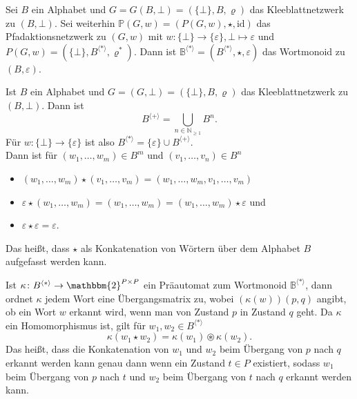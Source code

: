 \documentclass{article}
\begin{document}
\begin{definition}
  Sei $B$ ein Alphabet
  und $G = G(B, \bot) = (\{\bot\}, B, \varrho)$ das Kleeblattnetzwerk zu $(B, \bot)$.
  Sei weiterhin $\mathbb{P}(G, w) = (P(G, w), \star, \text{id})$ das Pfadaktionsnetzwerk
  zu $(G, w)$
  mit $w \colon \{\bot\} \to \{\varepsilon\}, \bot \mapsto \varepsilon$
  und $P(G, w) = (\{\bot\}, B^{\langle \ast \rangle}, \varrho^\ast)$.
  Dann ist $\mathbb{B}^{\langle \ast \rangle} = (B^{\langle \ast \rangle}, \star, \varepsilon)$
  das Wortmonoid zu $(B, \varepsilon)$.
\end{definition}

\begin{remark}
  Ist $B$ ein Alphabet und $G = (G, \bot) = (\{\bot\}, B, \varrho)$
  das Kleeblattnetzwerk zu $(B, \bot)$.
  Dann ist
  \begin{equation*}
    B^{\langle + \rangle} = \bigcup_{n \in \mathbb{N}_{\geq 1}} B^n.
  \end{equation*}
  Für $w \colon \{\bot\} \to \{\varepsilon\}$
  ist also $B^{\langle \ast \rangle} = \{\varepsilon\} \cup B^{\langle + \rangle}$. \\
  Dann ist für $(w_1, \dots, w_m) \in B^m$ und $(v_1, \dots, v_n) \in B^n$
  \begin{itemize}
    \item $(w_1, \dots, w_m) \star (v_1, \dots, v_m) = (w_1, \dots, w_m, v_1, \dots, v_m)$
    \item $\varepsilon \star (w_1, \dots, w_m) = (w_1, \dots, w_m) = (w_1, \dots, w_m) \star \varepsilon$ und
    \item $\varepsilon \star \varepsilon = \varepsilon.$
  \end{itemize}
  Das heißt, dass $\star$ als Konkatenation von Wörtern über dem Alphabet $B$ aufgefasst werden kann.
\end{remark}

\begin{remark}
  Ist $\kappa \colon B^{\langle \ast \rangle} \to \mathbbm{2}^{P \times P}$ ein Präautomat zum Wortmonoid $\mathbb{B}^{\langle \ast \rangle}$,
  dann ordnet $\kappa$ jedem Wort eine Übergangsmatrix zu,
  wobei $(\kappa(w))(p, q)$ angibt, ob ein Wort $w$
  erkannt wird, wenn man von Zustand $p$ in Zustand $q$ geht.
  Da $\kappa$ ein Homomorphismus ist, gilt für $w_1, w_2 \in B^{\langle \ast \rangle}$
  \begin{equation*}
    \kappa(w_1 \star w_2) = \kappa(w_1) \circledast \kappa(w_2).
  \end{equation*}
  Das heißt, dass die Konkatenation von $w_1$ und $w_2$ beim
  Übergang von $p$ nach $q$ erkannt werden kann
  genau dann wenn ein Zustand $t \in P$ existiert,
  sodass $w_1$ beim Übergang von $p$ nach $t$
  und $w_2$ beim Übergang von $t$ nach $q$ erkannt werden kann.
\end{remark}
\end{document}

